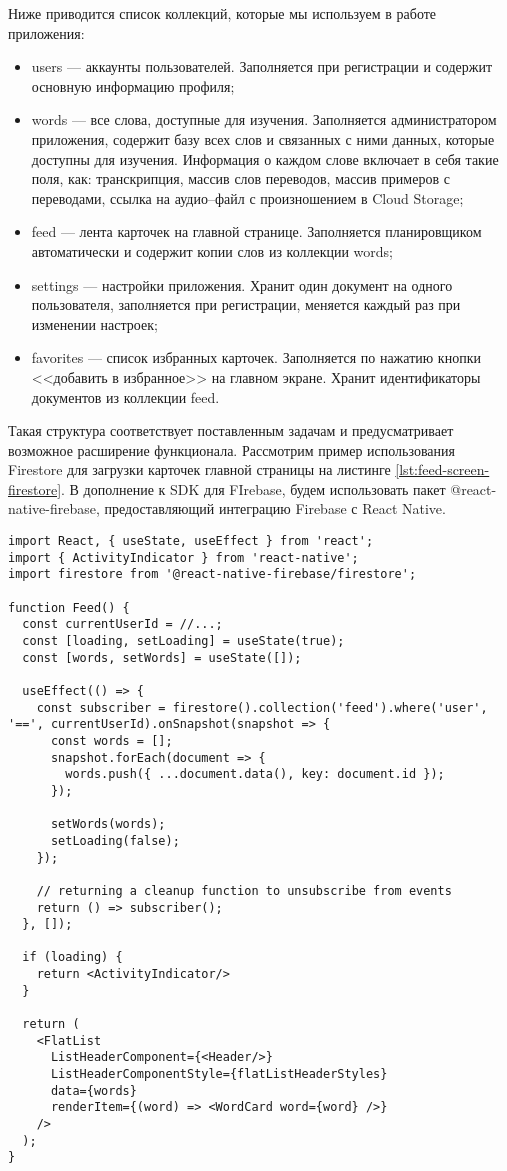 Ниже приводится список коллекций, которые мы используем в работе приложения:
\begin{itemize}
	\item users --- аккаунты пользователей. Заполняется при регистрации и содержит основную информацию профиля;
	\item words --- все слова, доступные для изучения. Заполняется администратором приложения, содержит базу всех слов и связанных с ними данных, которые доступны для изучения. Информация о каждом слове включает в себя такие поля, как: транскрипция, массив слов переводов, массив примеров с переводами, ссылка на аудио--файл с произношением в Cloud Storage;
	\item feed --- лента карточек на главной странице. Заполняется планировщиком автоматически и содержит копии слов из коллекции words;
	\item settings --- настройки приложения. Хранит один документ на одного пользователя, заполняется при регистрации, меняется каждый раз при изменении настроек;
	\item favorites --- список избранных карточек. Заполняется по нажатию кнопки <<добавить в избранное>> на главном экране. Хранит идентификаторы документов из коллекции feed.
\end{itemize}

Такая структура соответствует поставленным задачам и предусматривает возможное расширение функционала. Рассмотрим пример использования Firestore для загрузки карточек главной страницы на листинге \ref{lst:feed-screen-firestore}. В дополнение к SDK для FIrebase, будем использовать пакет @react-native-firebase, предоставляющий интеграцию Firebase с React Native.

\begin{lstlisting}[basicstyle=\fontsize{11}{11}\selectfont,tabsize=4,breaklines=true,caption={Загрузка и синхронизация данных с Firestore.},captionpos=b,label={lst:feed-screen-firestore}]
import React, { useState, useEffect } from 'react';
import { ActivityIndicator } from 'react-native';
import firestore from '@react-native-firebase/firestore';

function Feed() {
  const currentUserId = //...;
  const [loading, setLoading] = useState(true);
  const [words, setWords] = useState([]);
  
  useEffect(() => {
    const subscriber = firestore().collection('feed').where('user', '==', currentUserId).onSnapshot(snapshot => {
      const words = [];
      snapshot.forEach(document => {
        words.push({ ...document.data(), key: document.id });
      });
      
      setWords(words);
      setLoading(false);
    });
    
    // returning a cleanup function to unsubscribe from events
    return () => subscriber();
  }, []);
  
  if (loading) {
    return <ActivityIndicator/>
  }
  
  return (
    <FlatList
      ListHeaderComponent={<Header/>}
      ListHeaderComponentStyle={flatListHeaderStyles}
      data={words}
      renderItem={(word) => <WordCard word={word} />}
    />
  );
}
\end{lstlisting}


